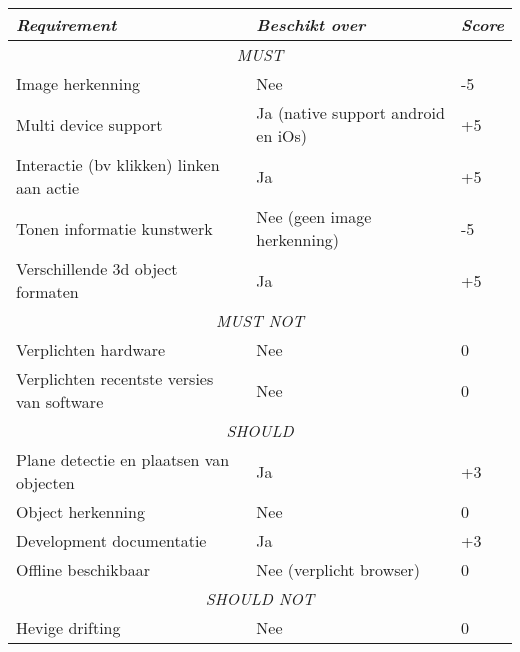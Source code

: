 \begin{table}[]
    \centering
    \begin{tabular}{@{}lll@{}}
        \toprule
        \textit{Requirement}                       & \textit{Beschikt over}             & \textit{Score} \\ \midrule
        \multicolumn{3}{c}{\textit{MUST}}                                                                \\ \midrule
        Image herkenning                           & Nee                                & -5             \\
        Multi device support                       & Ja (native support android en iOs) & +5             \\
        Interactie (bv klikken) linken aan actie   & Ja                                 & +5             \\
        Tonen informatie kunstwerk                 & Nee (geen image herkenning)        & -5             \\
        Verschillende 3d object formaten           & Ja                                 & +5             \\ \midrule
        \multicolumn{3}{c}{\textit{MUST NOT}}                                                            \\ \midrule
        Verplichten hardware                       & Nee                                & 0              \\
        Verplichten recentste versies van software & Nee                                & 0              \\ \midrule
        \multicolumn{3}{c}{\textit{SHOULD}}                                                              \\ \midrule
        Plane detectie en plaatsen van objecten    & Ja                                 & +3             \\
        Object herkenning                          & Nee                                & 0              \\
        Development documentatie                   & Ja                                 & +3              \\
        Offline beschikbaar                        & Nee (verplicht browser)            & 0           \\ \midrule
        \multicolumn{3}{c}{\textit{SHOULD NOT}}                                                          \\ \midrule
        Hevige drifting                            & Nee                                & 0              \\ \midrule

\end{tabular}
\end{table}

